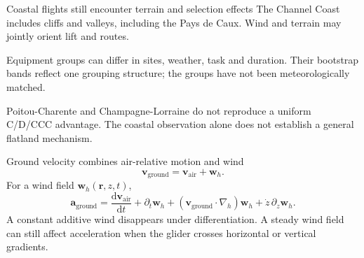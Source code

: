 \documentclass[11pt,aspectratio=169]{beamer}
\begin{document}
\begin{frame}{Coastal flights still encounter terrain and selection effects}
\small
The Channel Coast includes cliffs and valleys, including the Pays de Caux.
Wind and terrain may jointly orient lift and routes.
\par\medskip
Equipment groups can differ in sites, weather, task and duration. Their bootstrap
bands reflect one grouping structure; the groups have not been meteorologically
matched.
\par\medskip
Poitou-Charente and Champagne-Lorraine do not reproduce a uniform
C/D/CCC advantage. The coastal observation alone does not establish a general
flatland mechanism.
\end{frame}

\begin{frame}{Ground velocity combines air-relative motion and wind}
\[
 \mathbf v_{\mathrm{ground}}=\mathbf v_{\mathrm{air}}+\mathbf w_h.
\]
\small For a wind field $\mathbf w_h(\mathbf r,z,t)$,
\[
 \mathbf a_{\mathrm{ground}}
 =\frac{\mathrm d\mathbf v_{\mathrm{air}}}{\mathrm dt}
 +\partial_t\mathbf w_h
 +(\mathbf v_{\mathrm{ground}}\cdot\nabla_h)\mathbf w_h
 +\dot z\,\partial_z\mathbf w_h.
\]
A constant additive wind disappears under differentiation. A steady wind field
can still affect acceleration when the glider crosses horizontal or vertical gradients.
\end{frame}
\end{document}

